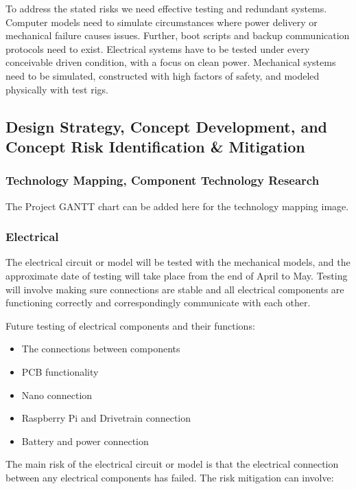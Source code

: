 \documentclass[a4paper, 10pt]{article}
\begin{document}
	To address the stated risks we need effective testing and redundant systems. Computer models need to simulate circumstances where power delivery or mechanical failure causes issues. Further, boot scripts and backup communication protocols need to exist. Electrical systems have to be tested under every conceivable driven condition, with a focus on clean power. Mechanical systems need to be simulated, constructed with high factors of safety, and modeled physically with test rigs.
 	 

	\subsection{Design Strategy, Concept Development, and Concept Risk Identification \& Mitigation}


		\subsubsection{Technology Mapping, Component Technology Research}
		
		The Project GANTT chart can be added here for the technology mapping image.

		\subsubsection{Electrical}
		The electrical circuit or model will be tested with the mechanical models, and the approximate date of testing will take place from the end of April to May. Testing will involve making sure connections are stable and all electrical components are functioning correctly and correspondingly communicate with each other. 
		
Future testing of electrical components and their functions:
\begin{itemize}
\item
The connections between components

\item
PCB functionality

\item
Nano connection

\item
Raspberry Pi and Drivetrain connection

\item
Battery and power connection
\end{itemize}

The main risk of the electrical circuit or model is that the electrical connection between any electrical components has failed. The risk mitigation can involve:
\end{document}
